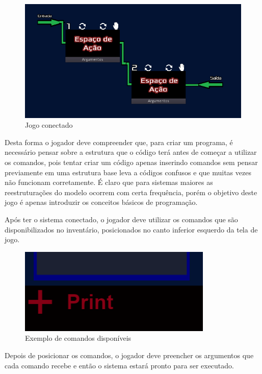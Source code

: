 \begin{figure}[H]
    \includegraphics[width=\textwidth]{../figuras/jogo_conectado.png}
    \caption{Jogo conectado}
\end{figure}

Desta forma o jogador deve compreender que, para criar um programa, é necessário
pensar sobre a estrutura que o código terá antes de começar a utilizar os 
comandos, pois tentar criar um código apenas inserindo comandos sem pensar
previamente em uma estrutura base leva a códigos confusos e que muitas vezes
não funcionam corretamente. É claro que para sistemas maiores as reestruturações
do modelo ocorrem com certa frequência, porém o objetivo deste jogo é apenas
introduzir os conceitos básicos de programação.

Após ter o sistema conectado, o jogador deve utilizar os comandos que são
disponibilizados no inventário, posicionados no canto inferior esquerdo da tela 
de jogo.

\begin{figure}[H]
    \includegraphics[scale=0.8]{../figuras/exemplo_comandos.png}
    \caption{Exemplo de comandos disponíveis}
\end{figure}

Depois de posicionar os comandos, o jogador deve preencher os argumentos que 
cada comando recebe e então o sistema estará pronto para ser executado.

